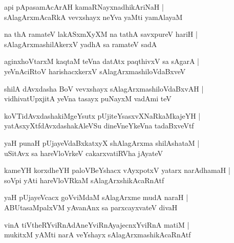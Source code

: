 \documentclass[twoside,12pt,openright]{book}
\newcounter{shloka}[chapter]
\begin{document}
\begin{shloka}
api pApasamAcArAH kamaRNayxnadhikAriNaH |\\
sAlagArxmAcaRkA vevxshayx neYva yaMti yamAlayaM 
\end{shloka}

\begin{shloka}
na thA ramateV lakASxmXyXM na tathA savxpureV hariH |\\
sAlagArxmashilAkerxV yadhA sa ramateV sadA 
\end{shloka}

\begin{shloka}
aginxhoVtarxM kaqtaM teVna datAtx paqthivxV sa sAgarA |\\
yeVnAciRtoV harishacxkerxV sAlagArxmashiloVdaBxveV
\end{shloka}

\begin{shloka}
shilA dAvxdasha BoV vevxshayx sAlagArxmashiloVdaBxvAH |\\
vidhivatUpxjitA yeVna tasayx puNayxM vadAmi teV 
\end{shloka}

\begin{shloka}
koVTidAvxdashakiMgeYsutx pUjiteYsasxvXNaRkaMkajeYH |\\
yatAsxyXtfdAvxdashakAleVSu dineVneYkeVna tadaBxveVtf 
\end{shloka}

\begin{shloka}
yaH punaH pUjayeVdaBxkatxyX shAlagArxma shilAshataM |\\
uSitAvx sa hareVloVrkeV cakarxvatiRVha jAyateV 
\end{shloka}

\begin{shloka}
kameYH korxdheYH paloVBeYshacx vAyxpotxV yatarx narAdhamaH |\\
soVpi yAti hareVloVRkaM sAlagArxshikAcaRnAtf 
\end{shloka}

\begin{shloka}
yaH pUjayeVcacx goVviMdaM sAlagArxme mudA naraH |\\
ABUtasaMpalxVM yAvanAnx sa parxcayxvateV divaH 
\end{shloka}

\begin{shloka}
vinA tiVtheRYviRnAdAneYviRnAyajecnxYviRnA matiM |\\
mukitxM yAMti narA veYshayx sAlagArxmashikAcaRnAtf 
\end{shloka}
\end{document}
